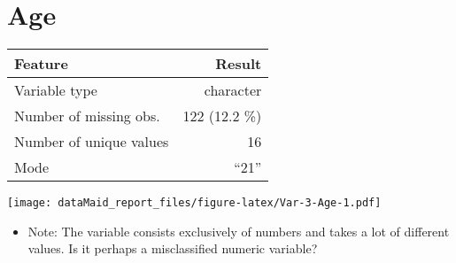 \documentclass[]{report}
\providecommand{\tightlist}{%
  \setlength{\itemsep}{0pt}\setlength{\parskip}{0pt}}
\newcommand{\fullline}{\noindent\makebox[\linewidth]{\rule{\textwidth}{0.4pt}}}
\newcommand{\bminione}{\begin{minipage}{0.75 \textwidth}}
\newcommand{\bminitwo}{\begin{minipage}{0.25 \textwidth}}
\newcommand{\emini}{\end{minipage}}
\begin{document}
\fullline

\hypertarget{age}{\section{Age}\label{age}}

\bminione

\begin{longtable}[]{@{}lr@{}}
\toprule
\begin{minipage}[b]{0.34\columnwidth}\raggedright\strut
Feature\strut
\end{minipage} & \begin{minipage}[b]{0.18\columnwidth}\raggedleft\strut
Result\strut
\end{minipage}\tabularnewline
\midrule
\endhead
\begin{minipage}[t]{0.34\columnwidth}\raggedright\strut
Variable type\strut
\end{minipage} & \begin{minipage}[t]{0.18\columnwidth}\raggedleft\strut
character\strut
\end{minipage}\tabularnewline
\begin{minipage}[t]{0.34\columnwidth}\raggedright\strut
Number of missing obs.\strut
\end{minipage} & \begin{minipage}[t]{0.18\columnwidth}\raggedleft\strut
122 (12.2 \%)\strut
\end{minipage}\tabularnewline
\begin{minipage}[t]{0.34\columnwidth}\raggedright\strut
Number of unique values\strut
\end{minipage} & \begin{minipage}[t]{0.18\columnwidth}\raggedleft\strut
16\strut
\end{minipage}\tabularnewline
\begin{minipage}[t]{0.34\columnwidth}\raggedright\strut
Mode\strut
\end{minipage} & \begin{minipage}[t]{0.18\columnwidth}\raggedleft\strut
``21''\strut
\end{minipage}\tabularnewline
\bottomrule
\end{longtable}

\emini
\bminitwo
\texttt{[image: dataMaid\_report\_files/figure-latex/Var-3-Age-1.pdf]}
\emini

\begin{itemize}
\tightlist
\item
  Note: The variable consists exclusively of numbers and takes a lot of
  different values. Is it perhaps a misclassified numeric variable?
\end{itemize}
\end{document}
